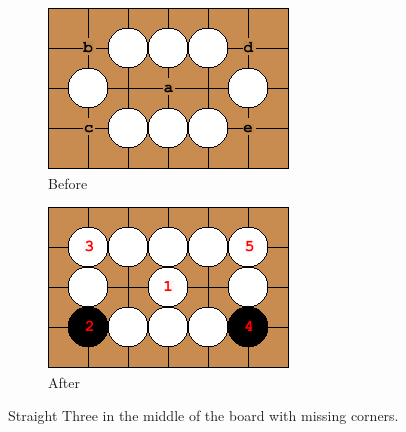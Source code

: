 \documentclass{l4proj}
\begin{document}
\begin{figure}[!ht]
\centering
\begin{subfigure}[b]{0.45\textwidth}
\centering
\includegraphics[width=\textwidth]{heur/1a.png}
\caption{Before}
\label{fig:heur-1a}
\end{subfigure}
\begin{subfigure}[b]{0.45\textwidth}
\centering
\includegraphics[width=\textwidth]{heur/1b.png}
\caption{After}
\label{fig:heur-1b}
\end{subfigure}
\caption{Straight Three in the middle of the board with missing corners.}
\label{fig:heur-1}
\end{figure}
\end{document}
